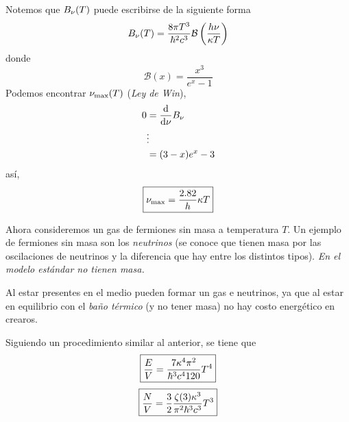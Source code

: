 \begin{sol}
Notemos que $B_\nu (T)$ puede escribirse de la siguiente forma
\begin{equation}
  B_\nu (T)=\frac{8\pi T^3}{\hbar^2c^3}\mathcal{B}\left(\frac{h\nu }{\kappa T}\right)
\end{equation}
donde 
\begin{equation}
  \mathcal{B}(x)=\frac{x^3}{e^x-1}
\end{equation}
Podemos encontrar $\nu_{\rm max}(T)$ (\textit{Ley de Win}),
\begin{align}
  0&=\dv{\nu}B_\nu \\
  &\vdots\\
  &=(3-x)e^x-3
\end{align}
así,
\begin{equation}
\boxed{  \nu_{\rm max}=\frac{2.82}{h}\kappa T}
\end{equation}
\end{sol}

\begin{ej}
	Ahora consideremos un gas de fermiones sin masa a temperatura $T$. Un ejemplo de fermiones sin masa son los \textit{neutrinos} (se conoce que tienen masa por las oscilaciones de neutrinos y la diferencia que hay entre los distintos tipos). \textit{En el modelo estándar no tienen masa.}
	
	Al estar presentes en el medio pueden formar un gas e neutrinos, ya que al estar en equilibrio con el \textit{baño térmico} (y no tener masa) no hay costo energético en crearos.
\end{ej}
\begin{sol}
	Siguiendo un procedimiento similar al anterior, se tiene que
	\begin{equation}
\boxed{  \frac{E}{V}=\frac{7\kappa^4\pi^2}{\hbar^3c^4120}T^4}
\end{equation}
\begin{equation}
\boxed{  \frac{N}{V}=\frac{3}{2}\frac{\zeta(3)\kappa^3}{\pi^2\hbar^3c^3}T^3}
\end{equation}


\end{sol}






























